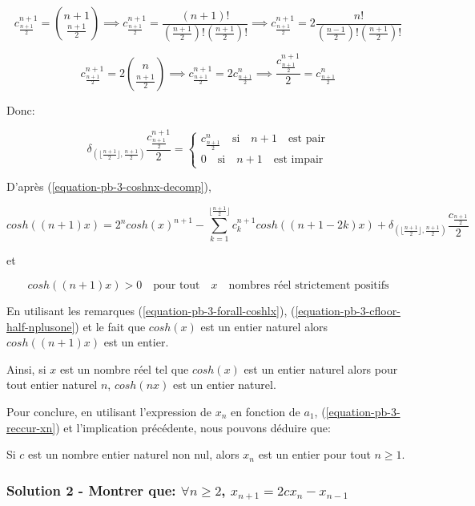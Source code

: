 \documentclass[12pt,a4paper,article]{memoir}
\newcommand{\floor}[1]{\lfloor #1 \rfloor}
\begin{document}
\[c_{\frac{n+1}{2}}^{n+1} = \binom{n+1}{\frac{n+1}{2}} \implies c_{\frac{n+1}{2}}^{n+1} = \frac{(n+1)!}{(\frac{n+1}{2})!(\frac{n+1}{2})!}  \implies c_{\frac{n+1}{2}}^{n+1} = 2 \frac{n!}{(\frac{n-1}{2})!(\frac{n+1}{2})!} \]

\[c_{\frac{n+1}{2}}^{n+1} = 2\binom{n}{\frac{n+1}{2}} \implies c_{\frac{n+1}{2}}^{n+1} = 2c_{\frac{n+1}{2}}^{n} \implies \frac{c_{\frac{n+1}{2}}^{n+1}}{2} = c_{\frac{n+1}{2}}^{n} \]

Donc: 

\begin{equation}
\delta_{(\floor{\frac{n+1}{2}}, \frac{n+1}{2})} \frac{c_{\frac{n+1}{2}}^{n+1}}{2} = \left\{
	\begin{array}{l}
	c_{\frac{n+1}{2}}^{n} \quad \textrm{si} \quad n+1 \quad \textrm{est pair}\\
	0 \quad \textrm{si} \quad n+1 \quad \textrm{est impair}
	\end{array}
\right.
\label{equation-pb-3-cfloor-half-nplusone}
\end{equation}

D'après (\ref{equation-pb-3-coshnx-decomp}),

\[cosh((n+1)x) = 2^{n}cosh(x)^{n+1} - \sum_{k=1}^{\floor{\frac{n+1}{2}}} c_{k}^{n+1} cosh((n+1-2k)x) + \delta_{(\floor{\frac{n+1}{2}}, \frac{n+1}{2})} \frac{c_{\frac{n+1}{2}}}{2}\]

et 

\[cosh((n+1)x) > 0 \quad \textrm{pour tout} \quad x \quad \textrm{nombres réel strictement positifs}\]

En utilisant les remarques (\ref{equation-pb-3-forall-coshlx}), (\ref{equation-pb-3-cfloor-half-nplusone}) et le fait que $cosh(x)$ est un entier naturel alors $cosh((n+1)x)$ est un entier.

\bigskip

Ainsi, si $x$ est un nombre réel tel que $cosh(x)$ est un entier naturel alors pour tout entier naturel $n$, $cosh(nx)$ est un entier naturel.

\bigskip

Pour conclure, en utilisant l'expression de $x_{n}$ en fonction de $a_{1}$, (\ref{equation-pb-3-reccur-xn}) et l'implication précédente, nous pouvons déduire que:

\bigskip

Si $c$ est un nombre entier naturel non nul, alors $x_{n}$ est un entier pour tout $n \geq 1$.
 
\subsubsection{Solution 2 - Montrer que: $\forall n \geq 2$, $x_{n+1} = 2cx_{n} - x_{n-1}$}
\end{document}
